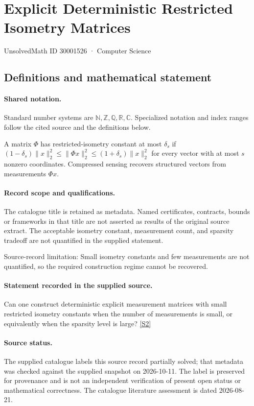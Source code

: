 \documentclass[11pt]{article}
\newcommand{\sref}[2]{\hyperlink{source:#1:#2}{[S#2]}}
\begin{document}
\setcounter{section}{30001525}
\section{Explicit Deterministic Restricted Isometry Matrices}\label{30001526}
{\small\sffamily UnsolvedMath ID 30001526 · Computer Science}
\subsection{Definitions and mathematical statement}

\paragraph{Shared notation.}Standard number systems are $\mathbb N,\mathbb Z,\mathbb Q,\mathbb R,\mathbb C$. Specialized notation and index ranges follow the cited source and the definitions below.


A matrix $\Phi$ has restricted-isometry constant at most $\delta_s$ if $(1-\delta_s)\lVert x\rVert_2^2\leq\lVert\Phi x\rVert_2^2\leq(1+\delta_s)\lVert x\rVert_2^2$ for every vector with at most $s$ nonzero coordinates. Compressed sensing recovers structured vectors from measurements $\Phi x$.
\paragraph{Record scope and qualifications.}
The catalogue title is retained as metadata. Named certificates, contracts, bounds or frameworks in that title are not asserted as results of the original source extract.
The acceptable isometry constant, measurement count, and sparsity tradeoff are not quantified in the supplied statement.

Source-record limitation: Small isometry constants and few measurements are not quantified, so the required construction regime cannot be recovered.
\paragraph{Statement recorded in the supplied source.}
Can one construct deterministic explicit measurement matrices with small restricted isometry constants when the number of measurements is small, or equivalently when the sparsity level is large? \sref{30001526}{2}
\paragraph{Source status.}
The supplied catalogue labels this source record partially solved; that metadata was checked against the supplied snapshot on 2026-10-11. The label is preserved for provenance and is not an independent verification of present open status or mathematical correctness. The catalogue literature assessment is dated 2026-08-21.
\end{document}
